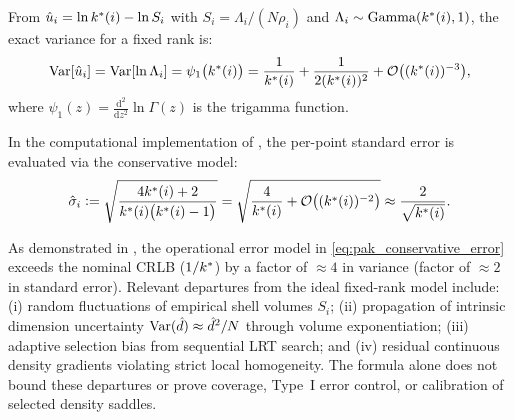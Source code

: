 \begin{theorem}
  \label{thm:trigamma_variance}
  From $\hat{u}_i = \ln k^{*}(i) - \ln S_i$ with $S_i = \Lambda_i /
  (N \rho_i)$ and $\Lambda_i \sim \mathrm{Gamma}(k^{*}(i), 1)$, the
  exact variance for a fixed rank is:
  \begin{equation}
    \operatorname{Var}[\hat{u}_i] = \operatorname{Var}[\ln \Lambda_i] =
    \psi_1\bigl(k^{*}(i)\bigr) = \frac{1}{k^{*}(i)} +
    \frac{1}{2(k^{*}(i))^2} + \mathcal{O}\bigl((k^{*}(i))^{-3}\bigr),
    \label{eq:trigamma_exact}
  \end{equation}
  where $\psi_1(z) = \frac{\mathrm{d}^2}{\mathrm{d}z^2}\ln
  \Gamma(z)$ is the trigamma function.
\end{theorem}

\begin{definition}
  \label{def:pak_error_formula}
  In the computational implementation of \pak{}, the per-point
  standard error is evaluated via the conservative model:
  \begin{equation}
    \hat{\sigma}_i \mathrel{\mathop:}= \sqrt{\frac{4k^{*}(i) +
    2}{k^{*}(i)\bigl(k^{*}(i) - 1\bigr)}} =
    \sqrt{\frac{4}{k^{*}(i)} +
    \mathcal{O}\bigl((k^{*}(i))^{-2}\bigr)} \approx
    \frac{2}{\sqrt{k^{*}(i)}}.
    \label{eq:pak_conservative_error}
  \end{equation}
\end{definition}

\begin{remark}
  \label{rem:conservative_justification}
  As demonstrated in , the
  operational error model in \cref{eq:pak_conservative_error} exceeds
  the nominal CRLB ($1/k^{*}$) by a factor of $\approx \num{4}$ in
  variance (factor of $\approx \num{2}$ in standard error). Relevant
  departures from the ideal fixed-rank model include:
  (i) random fluctuations of empirical shell volumes $S_i$;
  (ii) propagation of intrinsic dimension uncertainty $\operatorname{Var}(\hat{d})
  \approx \hat{d}^2/N$ through volume exponentiation;
  (iii) adaptive selection bias from sequential LRT search; and
  (iv) residual continuous density gradients violating strict local
  homogeneity.
  The formula alone does not bound these departures or prove coverage,
  Type~I error control, or calibration of selected density saddles.
\end{remark}

